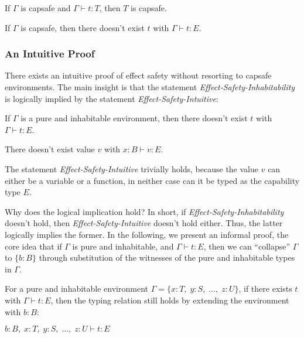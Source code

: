 \begin{lemma}
  If $\Gamma$ is capsafe and $\Gamma \vdash t : T$, then $T$ is capsafe.
\end{lemma}

\begin{theorem}
  If $\Gamma$ is capsafe, then there doesn't exist $t$ with
  $\Gamma \vdash t : E$.
\end{theorem}

\subsubsection{An Intuitive Proof}

There exists an intuitive proof of effect safety without resorting to
capsafe environments. The main insight is that the statement
\emph{Effect-Safety-Inhabitability} is logically implied by the
statement \emph{Effect-Safety-Intuitive}:

\begin{definition}
  If $\Gamma$ is a pure and inhabitable environment, then there
  doesn't exist $t$ with $\Gamma \vdash t : E$.
\end{definition}

\begin{definition}
  There doesn't exist value $v$ with $x:B \vdash v : E$.
\end{definition}

The statement \emph{Effect-Safety-Intuitive} trivially holds, because
the value $v$ can either be a variable or a function, in neither case
can it be typed as the capability type $E$.

Why does the logical implication hold? In short, if
\emph{Effect-Safety-Inhabitability} doesn't hold, then
\emph{Effect-Safety-Intuitive} doesn't hold either. Thus, the latter
logically implies the former.  In the following, we present an
informal proof, the core idea that if $\Gamma$ is pure and
inhabitable, and $\Gamma \vdash t : E$, then we can ``collapse''
$\Gamma$ to $\{b : B\}$ through substitution of the witnesses of the
pure and inhabitable types in $\Gamma$.

For a pure and inhabitable environment
$\Gamma = \{x:T, \; y:S, \; \dots, \; z:U\}$, if there exists $t$ with
$\Gamma \vdash t : E$, then the typing relation still holds by
extending the environment with $b:B$:

\begin{center}
$b:B, \; x:T, \; y:S, \; \dots, \; z:U \vdash t: E$
\end{center}

